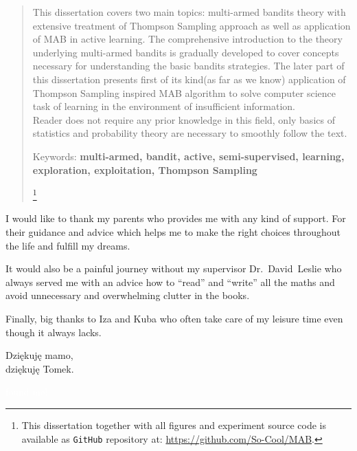\documentclass[12pt, a4paper, pdflatex, leqno]{report}
\newenvironment{dedication}
  {\clearpage           %
   \thispagestyle{empty}%
   \vspace*{\stretch{1}}%
   \itshape             %
   \raggedright          %
   \par\setlength{\leftskip}{0.3\textwidth}\noindent\ignorespaces
  }
  {\par %
   \vspace{\stretch{3}} %
   \clearpage           %
  }
\begin{document}
\begin{abstract}
\thispagestyle{empty}%
This dissertation covers two main topics: multi-armed bandits theory with extensive treatment of Thompson Sampling approach as well as application of MAB in active learning. The comprehensive introduction to the theory underlying multi-armed bandits is gradually developed to cover concepts necessary for understanding the basic bandits strategies. The later part of this dissertation presents first of its kind(as far as we know) application of Thompson Sampling inspired MAB algorithm to solve computer science task of learning in the environment of insufficient information.\\
Reader does not require any prior knowledge in this field, only basics of statistics and probability theory are necessary to smoothly follow the text.\\
\begin{center}
Keywords: \textbf{multi-armed, bandit, active, semi-supervised, learning, exploration, exploitation, Thompson Sampling}

\let\thefootnote\relax\footnote{\noindent This dissertation together with all figures and experiment source code is available as \texttt{GitHub} repository at: \url{https://github.com/So-Cool/MAB}.}

\end{center}
\end{abstract}

\begin{dedication}
I would like to thank my parents who provides me with any kind of support. For their guidance and advice which helps me to make the right choices throughout the life and fulfill my dreams.\newline

It would also be a painful journey without my supervisor Dr.~David~Leslie who always served me with an advice how to ``read'' and ``write'' all the maths and avoid unnecessary and overwhelming clutter in the books.\newline

Finally, big thanks to Iza and Kuba who often take care of my leisure time even though it always lacks.\\[2cm]


\begin{flushright}
Dzi\k{e}kuj\k{e} mamo,\\
dzi\k{e}kuj\k{e} Tomek.
\end{flushright}



\textcolor{white}{found me!}



\end{dedication}
\end{document}
